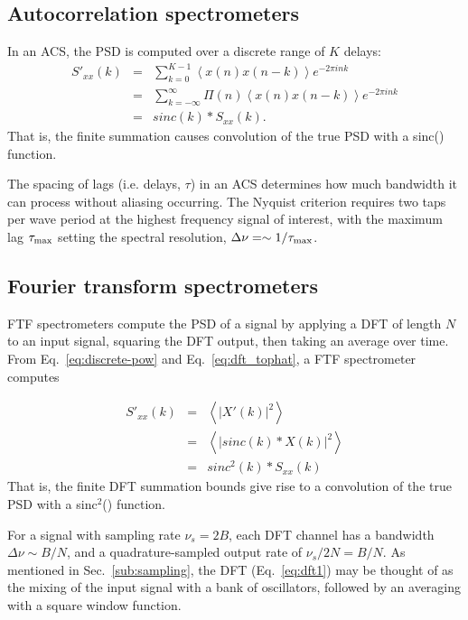 \documentclass{ws-rv961x669}
\begin{document}
\subsection{Autocorrelation spectrometers}\label{sub:acs}

In an ACS, the PSD is computed over a discrete range of $K$ delays:
\begin{eqnarray}
S'_{xx}(k) & = & \sum_{k=0}^{K-1}\left\langle x(n)x(n-k)\right\rangle e^{-2\pi ink} \\
          & = &  \sum_{k=-\infty}^{\infty}\Pi(n)\left\langle x(n)x(n-k)\right\rangle e^{-2\pi ink} \\
          & = &  sinc(k) * S_{xx}(k).\label{eq:acs_sinc}
\end{eqnarray}
That is, the finite summation causes convolution of the true PSD with a sinc() function. 

The spacing of lags (i.e. delays, $\tau$) in an ACS determines how much bandwidth it can process without aliasing occurring. The Nyquist criterion requires two taps per wave period at the highest frequency signal of interest, with the maximum lag $\tau_{\rm{max}}$ setting the spectral resolution, $\Delta\nu = \sim 1 / \tau_{\rm{max}}$.

\subsection{Fourier transform spectrometers}\label{sub:ftf}

FTF spectrometers compute the PSD of a signal by applying a DFT of length $N$ to an input signal, squaring the DFT output, then taking an average over time. From Eq.~\ref{eq:discrete-pow} and Eq.~\ref{eq:dft_tophat}, a FTF spectrometer computes

\begin{eqnarray}
	S'_{xx}(k) & = & \left\langle \left|X'(k)\right|^{2}\right\rangle \\
	    & = & \left\langle \left|sinc(k)*X(k)\right|^{2}\right\rangle \\
	    & = & sinc^2(k) * S_{xx}(k) \label{eq:ftf_sinc}
\end{eqnarray}
That is, the finite DFT summation bounds give rise to a convolution of the true PSD with a sinc$^2$() function.

For a signal with sampling rate $\nu_s=2B$, each DFT channel has a bandwidth $\Delta\nu \sim B/N$, and a quadrature-sampled output rate of $\nu_s/2N = B/N$. As mentioned in Sec.~\ref{sub:sampling}, the DFT (Eq.~\ref{eq:dft1}) may be thought of as the mixing of the input signal with a bank of oscillators, followed by an averaging with a square window function. 
\end{document}
